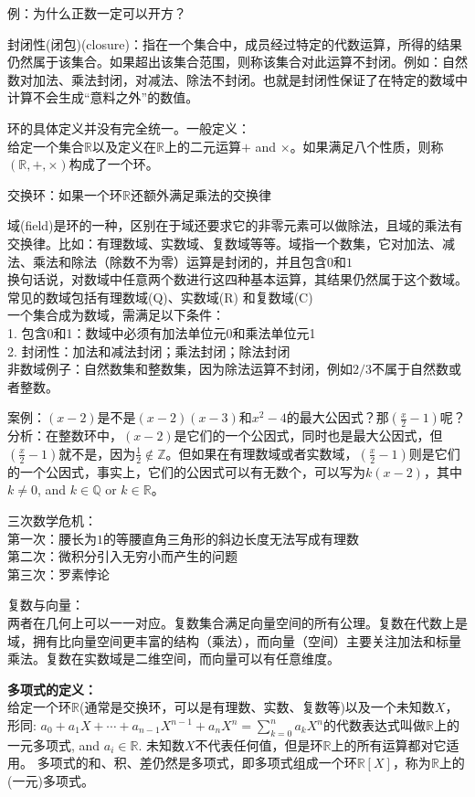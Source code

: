 \documentclass[../main.tex]{subfiles}
\begin{document}
例：为什么正数一定可以开方？

封闭性(闭包)(closure)：指在一个集合中，成员经过特定的代数运算，所得的结果仍然属于该集合。如果超出该集合范围，则称该集合对此运算不封闭。例如：自然数对加法、乘法封闭，对减法、除法不封闭。也就是封闭性保证了在特定的数域中计算不会生成“意料之外”的数值。

环的具体定义并没有完全统一。一般定义：\\
给定一个集合$\mathbb{R}$以及定义在$\mathbb{R}$上的二元运算$+$ and $\times$。如果满足八个性质，则称$(\mathbb{R}, +, \times)$构成了一个环。

交换环：如果一个环$\mathbb{R}$还额外满足乘法的交换律

域(field)是环的一种，区别在于域还要求它的非零元素可以做除法，且域的乘法有交换律。比如：有理数域、实数域、复数域等等。域指一个数集，它对加法、减法、乘法和除法（除数不为零）运算是封闭的，并且包含$0$和$1$\\
换句话说，对数域中任意两个数进行这四种基本运算，其结果仍然属于这个数域。\\
常见的数域包括有理数域(Q)、实数域(R) 和复数域(C)\\
一个集合成为数域，需满足以下条件：\\
1. 包含0和1：数域中必须有加法单位元0和乘法单位元1\\
2. 封闭性：加法和减法封闭；乘法封闭；除法封闭\\
非数域例子：自然数集和整数集，因为除法运算不封闭，例如$2/3$不属于自然数或者整数。

案例：$(x-2)$是不是$(x-2)(x-3)$和$x^2-4$的最大公因式？那$(\frac{x}{2} -1)$呢？\\
分析：在整数环中，$(x-2)$是它们的一个公因式，同时也是最大公因式，但$(\frac{x}{2}-1)$就不是，因为$\frac{1}{2}\notin \mathbb{Z}$。但如果在有理数域或者实数域，$(\frac{x}{2}-1)$则是它们的一个公因式，事实上，它们的公因式可以有无数个，可以写为$k(x-2)$，其中$k\neq 0$, and $k\in \mathbb{Q}$ or $k\in \mathbb{R}$。

三次数学危机：\\
第一次：腰长为$1$的等腰直角三角形的斜边长度无法写成有理数\\
第二次：微积分引入无穷小而产生的问题\\
第三次：罗素悖论

复数与向量：\\
两者在几何上可以一一对应。复数集合满足向量空间的所有公理。复数在代数上是域，拥有比向量空间更丰富的结构（乘法），而向量（空间）主要关注加法和标量乘法。复数在实数域是二维空间，而向量可以有任意维度。

\textbf{多项式的定义：}\\
给定一个环$\mathbb{R}$(通常是交换环，可以是有理数、实数、复数等)以及一个未知数$X$，形同:
$a_0+a_1X+\cdots +a_{n-1}X^{n-1}+a_nX^n = \sum_{k=0}^na_kX^n$的代数表达式叫做$\mathbb{R}$上的一元多项式, and $ a_i\in \mathbb{R}$. 未知数$X$不代表任何值，但是环$\mathbb{R}$上的所有运算都对它适用。
多项式的和、积、差仍然是多项式，即多项式组成一个环$\mathbb{R}[X]$，称为$\mathbb{R}$上的(一元)多项式。
\end{document}
